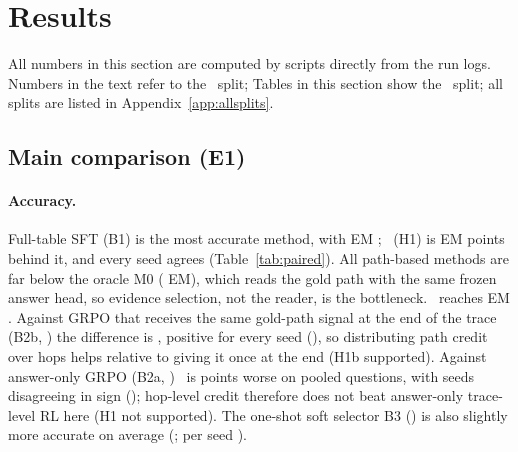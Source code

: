 \section{Results}
\label{sec:results}

All numbers in this section are computed by scripts directly from the run logs.
Numbers in the text refer to the \splitname\ split; Tables in this section show the \splitname\ split; all splits are listed in Appendix~\ref{app:allsplits}.

\subsection{Main comparison (E1)}
\begin{table}[t]
\centering\small
\resizebox{\textwidth}{!}{}
\caption{In-domain comparison on HybridQA: exact match (EM) with seed mean $\pm$ std and a 95\% bootstrap interval over questions, token F1, strict path validity, hop efficiency and mean hops (definitions in Section~\ref{sec:setup}). Path metrics use questions with a gold path; B1 has no hops. All path-based methods share the encoder, candidates and frozen answer head, and all trained methods use the same rollout and tuning budgets.}
\label{tab:main}
\end{table}

\paragraph{Accuracy.}
Full-table SFT (B1) is the most accurate method, with  EM ; \hop\ (H1) is  EM points behind it, and every seed agrees (Table~\ref{tab:paired}).
All path-based methods are far below the oracle M0 ( EM), which reads the gold path with the same frozen answer head, so evidence selection, not the reader, is the bottleneck.
\hop\ reaches  EM .
Against GRPO that receives the same gold-path signal at the end of the trace (B2b, ) the difference is , positive for every seed (), so distributing path credit over hops helps relative to giving it once at the end (H1b supported).
Against answer-only GRPO (B2a, ) \hop\ is  points worse on pooled questions, with seeds disagreeing in sign (); hop-level credit therefore does not beat answer-only trace-level RL here (H1 not supported).
The one-shot soft selector B3 () is also slightly more accurate on average (; per seed ).

